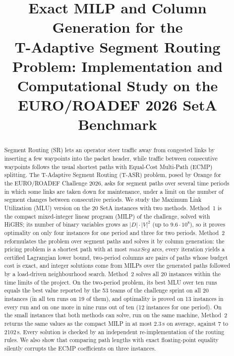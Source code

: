 \documentclass[conference]{IEEEtran}
\begin{document}
\title{Exact MILP and Column Generation for the\\ T-Adaptive Segment Routing Problem: Implementation and Computational Study on the EURO/ROADEF 2026 SetA Benchmark}

\author{
}

\maketitle

\begin{abstract}
Segment Routing (SR) lets an operator steer traffic away from congested links by inserting a few waypoints into the packet header, while traffic between consecutive waypoints follows the usual shortest paths with Equal-Cost Multi-Path (ECMP) splitting. The T-Adaptive Segment Routing (T-ASR) problem, posed by Orange for the EURO/ROADEF Challenge 2026, asks for segment paths over several time periods in which some links are taken down for maintenance, under a limit on the number of segment changes between consecutive periods. We study the Maximum Link Utilization (MLU) version on the 20 SetA instances with two methods. Method~1 is the compact mixed-integer linear program (MILP) of the challenge, solved with HiGHS; its number of binary variables grows as $|D|\cdot|V|^2$ (up to $9.6\cdot10^8$), so it proves optimality on only four instances for one period and three for two periods. Method~2 reformulates the problem over segment paths and solves it by column generation: the pricing problem is a shortest path with at most $maxSeg$ arcs, every iteration yields a certified Lagrangian lower bound, two-period columns are pairs of paths whose budget cost is exact, and integer solutions come from MILPs over the generated paths followed by a load-driven neighbourhood search. Method~2 solves all 20 instances within the time limits of the project. On the two-period problem, its best MLU over ten runs equals the best value reported by the 53 teams of the challenge sprint on all 20 instances (in all ten runs on 19 of them), and optimality is proved on 13 instances in every run and on one more in nine runs out of ten (12 instances for one period). On the small instances that both methods can solve, run on the same machine, Method~2 returns the same values as the compact MILP in at most 2.3\,s on average, against 7 to 2102\,s. Every solution is checked by an independent re-implementation of the routing rules. We also show that comparing path lengths with exact floating-point equality silently corrupts the ECMP coefficients on three instances.
\end{abstract}
\end{document}
